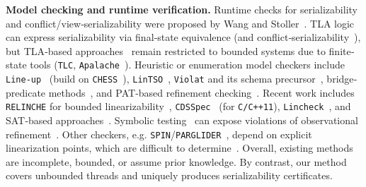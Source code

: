 \smallskip
\noindent
\textbf{Model checking and runtime verification.}
%
Runtime checks for serializability and conflict/view‐serializability were proposed by Wang and Stoller~\cite{WaSt06a,WaSt06b}.  
TLA logic~\cite{La94} can express serializability via final‐state equivalence (and conflict‐serializability~\cite{CoOlPnTuZu07}), but TLA‐based approaches~\cite{SoVaVi20,Ho24} remain restricted to bounded systems due to finite‐state tools (\texttt{TLC}, \texttt{Apalache}~\cite{YuMaLa99,KoKuTr19}).  
Heuristic or enumeration model checkers include \texttt{Line-up}~\cite{BuDeMuTa10} (build on \texttt{CHESS}~\cite{MuQaBaBaNaNe08}), \texttt{LinTSO}~\cite{BuGoMuYa12}, \texttt{Violat} and its schema precursor~\cite{EmEn19,EmEn18}, bridge‐predicate methods~\cite{BuNeSe11,BuSe09}, and PAT‐based refinement checking~\cite{LiChLiSuZhDo12,SuLuDoPa09,LiChLiSu09,Zh11}.  
Recent work includes \texttt{RELINCHE} for bounded linearizability~\cite{GoKoVa25}, \texttt{CDSSpec}~\cite{OuDe17} (for \texttt{C/C++11}), \texttt{Lincheck}~\cite{KoDeSoTsAl23}, and SAT‐based approaches~\cite{BuAlMa07}.  
Symbolic testing~\cite{EmEnHa15} can expose violations of observational refinement~\cite{FiOhRiYa10,BoEmCoHa15}.  
Other checkers, e.g. \texttt{SPIN}/\texttt{PARGLIDER}~\cite{Fl04,VeYaYo09,Ho97,VeYa08}, depend on explicit linearization points, which are difficult to determine~\cite{VeYaYo09}.  
Overall, existing methods are incomplete, bounded, or assume prior knowledge.  
By contrast, our method covers unbounded threads and uniquely produces serializability certificates.



